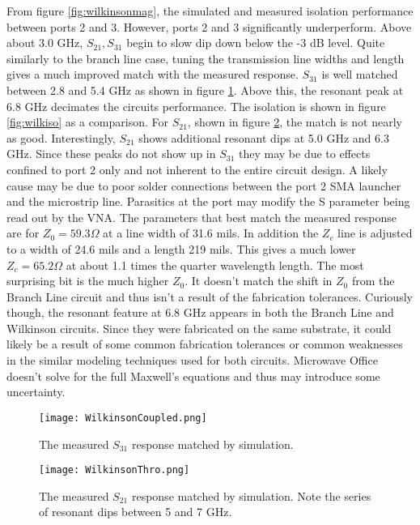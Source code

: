 \documentclass[twocolumn, aps, apl]{revtex4-1}
\begin{document}
From figure \ref{fig:wilkinsonmag}, the simulated and measured isolation performance between ports 2 and 3. However, ports 2 and 3 significantly underperform. Above about 3.0 GHz, $S_{21}, S_{31}$ begin to slow dip down below the -3 dB level. Quite similarly to the branch line case, tuning the transmission line widths and length gives a much improved match with the measured response. $S_{31}$ is well matched between 2.8 and 5.4 GHz as shown in figure \ref{fig:wilkcoup}. Above this, the resonant peak at 6.8 GHz decimates the circuits performance. The isolation is shown in figure \ref{fig:wilkiso} as a comparison. For $S_{21}$, shown in figure \ref{fig:wilkthro}, the match is not nearly as good. Interestingly, $S_{21}$ shows additional resonant dips at 5.0 GHz and 6.3 GHz. Since these peaks do not show up in $S_{31}$ they may be due to effects confined to port 2 only and not inherent to the entire circuit design. A likely cause may be due to poor solder connections between the port 2 SMA launcher and the microstrip line. Parasitics at the port may modify the S parameter being read out by the VNA. The parameters that best match the measured response are for $Z_0 = 59.3 \Omega$ at a line width of 31.6 mils. In addition the $Z_c$ line is adjusted to a width of 24.6 mils and a length 219 mils. This gives a much lower $Z_c = 65.2 \Omega$ at about 1.1 times the quarter wavelength length. The most surprising bit is the much higher $Z_0$. It doesn't match the shift in $Z_0$ from the Branch Line circuit and thus isn't a result of the fabrication tolerances. Curiously though, the resonant feature at 6.8 GHz appears in both the Branch Line and Wilkinson circuits. Since they were fabricated on the same substrate, it could likely be a result of some common fabrication tolerances or common weaknesses in the similar modeling techniques used for both circuits. Microwave Office doesn't solve for the full Maxwell's equations and thus may introduce some uncertainty.


\begin{figure}[!htbp]
    \centering
    \texttt{[image: WilkinsonCoupled.png]}
    \caption{The measured $S_{31}$ response matched by simulation. }
    \label{fig:wilkcoup}
\end{figure}

\begin{figure}[!htbp]
    \centering
    \texttt{[image: WilkinsonThro.png]}
    \caption{The measured $S_{21}$ response matched by simulation. Note the series of resonant dips between 5 and 7 GHz. }
    \label{fig:wilkthro}
\end{figure}
\end{document}
